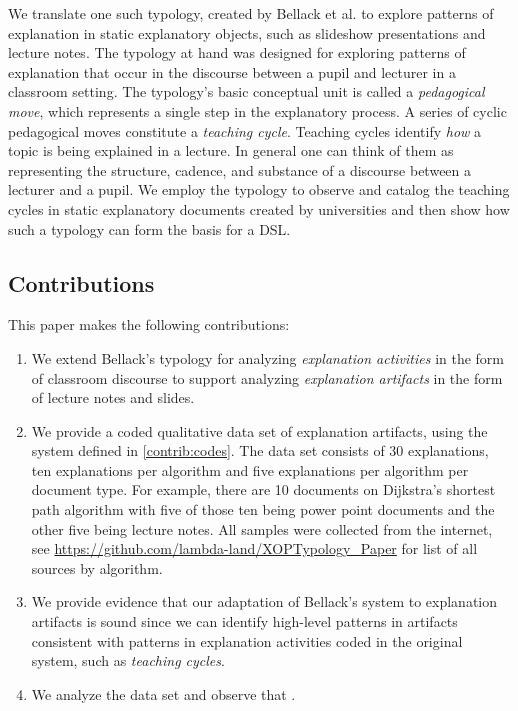 \documentclass[conference]{IEEEtran}
\begin{document}
We translate one such typology, created by Bellack et
al.\cite{bellack1966language} to explore patterns of explanation in static
explanatory objects, such as slideshow presentations and lecture notes. The
typology at hand was designed for exploring patterns of explanation that occur
in the discourse between a pupil and lecturer in a classroom setting. The
typology's basic conceptual unit is called a \emph{pedagogical move}, which
represents a single step in the explanatory process. A series of cyclic
pedagogical moves constitute a \emph{teaching cycle}. Teaching cycles identify
\emph{how} a topic is being explained in a lecture. In general one can think of
them as representing the structure, cadence, and substance of a discourse
between a lecturer and a pupil. We employ the typology to observe and catalog
the teaching cycles in static explanatory documents created by universities and
then show how such a typology can form the basis for a DSL.

\subsection{Contributions}

This paper makes the following contributions:
%
\begin{enumerate}[C1.]

\item \label{contrib:codes}
%
We extend Bellack's typology for analyzing \emph{explanation activities} in the
form of classroom discourse to support analyzing \emph{explanation artifacts}
in the form of lecture notes and slides.

\item \label{contrib:data}
%
We provide a coded qualitative data set of explanation artifacts, using the
system defined in \ref{contrib:codes}. The data set consists of 30
explanations, ten explanations per algorithm and five explanations per algorithm
per document type. For example, there are 10 documents on Dijkstra's shortest
path algorithm with five of those ten being power point documents and the other
five being lecture notes. All samples were collected from the internet, see
\url{https://github.com/lambda-land/XOPTypology_Paper} for list of all sources
by algorithm. 

\item \label{contrib:valid}
%
We provide evidence that our adaptation of Bellack's system to explanation
artifacts is sound since we can identify high-level patterns in artifacts
consistent with patterns in explanation activities coded in the original
system, such as \emph{teaching cycles}.

\item \label{contrib:valid}
%
We analyze the data set and observe that .

\end{enumerate}
\end{document}
